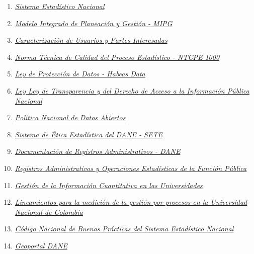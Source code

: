 \documentclass[
]{book}
\providecommand{\tightlist}{%
  \setlength{\itemsep}{0pt}\setlength{\parskip}{0pt}}
\begin{document}
\begin{enumerate}
\def\labelenumi{\arabic{enumi}.}
\tightlist
\item
  \emph{\href{https://www.dane.gov.co/index.php/sistema-estadistico-nacional-sen}{Sistema Estadístico Nacional}}
\item
  \emph{\href{https://www.funcionpublica.gov.co/web/mipg}{Modelo Integrado de Planeación y Gestión - MIPG}}
\item
  \emph{\href{http://siga.unal.edu.co/images/Modulos/Ova/Caracterizacin-de-usuarios-y-partes-interesadas.pdf}{Caracterización de Usuarios y Partes Interesadas}}
\item
  \emph{\href{https://www.dane.gov.co/files/sen/normatividad/NTC-Proceso-Estadistico-PE-1000-2020.pdf}{Norma Técnica de Calidad del Proceso Estadístico - NTCPE 1000}}
\item
  \emph{\href{https://www.funcionpublica.gov.co/eva/gestornormativo/norma.php?i=49981}{Ley de Protección de Datos - Habeas Data}}
\item
  \emph{\href{https://www.funcionpublica.gov.co/eva/gestornormativo/norma.php?i=56882}{Ley Ley de Transparencia y del Derecho de Acceso a la Información Pública Nacional}}
\item
  \emph{\href{https://www.datos.gov.co/}{Política Nacional de Datos Abiertos}}
\item
  \emph{\href{https://www.sen.gov.co/files/sen/Documento\%20Maestro\%20SETE.pdf}{Sistema de Ética Estadística del DANE - SETE}}
\item
  \emph{\href{https://www.dane.gov.co/index.php/sistema-estadistico-nacional-sen/registros-administrativos/documentacion-registros-administrativos}{Documentación de Registros Administrativos - DANE}}
\item
  \emph{\href{https://www.funcionpublica.gov.co/VisualSIE/faces/javax.faces.resource/docs/Documento_operaciones_estadisticas_y_registros_administrativos.pdf}{Registros Administrativos y Operaciones Estadísticas de la Función Pública}}
\item
  \emph{\href{https://estadisticaun.github.io/L_Conceptual/}{Gestión de la Información Cuantitativa en las Universidades}}
\item
  \emph{\href{https://estadisticaun.github.io/L_procesos/}{Lineamientos para la medición de la gestión por procesos en la Universidad Nacional de Colombia}}
\item
  \emph{\href{https://www.dane.gov.co/files/sen/bp/Codigo_nal_buenas_practicas.pdf}{Código Nacional de Buenas Prácticas del Sistema Estadístico Nacional}}
\item
  \emph{\href{https://geoportal.dane.gov.co/}{Geoportal DANE}}
\end{enumerate}
\end{document}
